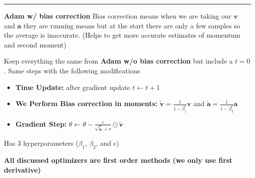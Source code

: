 \documentclass[twocolumn, letter, 10pt, landscape]{article}
\newcommand{\mb}{\mathbf}
\newcommand{\tb}{\textbf}
\newcommand{\bit}{\vspace{-0.1in}\begin{itemize}\setlength\itemsep{-0.05in}}
\newcommand{\eit}{\end{itemize}\vspace{-0.1in}}
\newcommand{\eps}{\epsilon}
\begin{document}
\hrule
\tb{Adam w/ bias correction}
Bias correction means when we are taking our $\mb{v}$ and $\mb{a}$ they are running means but at the start there are only a few samples so the average is inaccurate. (Helps to get more accurate estimates of momentum and second moment)

Keep everything the same from \tb{Adam w/o bias correction} but include a $t=0$. Same steps with the following modifications
\bit{}
\item \tb{Time Update:} after gradient update $t\leftarrow t+1$
\item \tb{We Perform Bias correction in moments:} $\tilde{\mb{v}}=\frac{1}{1-\beta_1^t}\mb{v}$ and $\tilde{\mb{a}} = \frac{1}{1-\beta_2^t}\mb{a}$
\item \tb{Gradient Step:} $\theta\leftarrow\theta-\frac{\eps}{\sqrt{\tilde{\mb{a}}}+\nu}\odot\tilde{\mb{v}}$
\eit{}
Has $3$ hyperparameters ($\beta_1$, $\beta_2$, and $\eps$)

\tb{All discussed optimizers are first order methods (we only use first derivative)}

\end{document}
